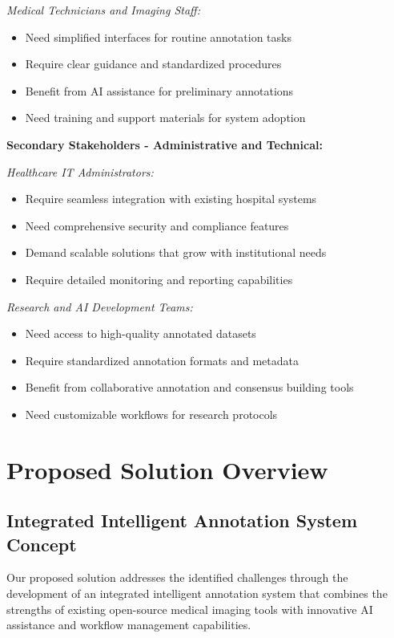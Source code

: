\textit{Medical Technicians and Imaging Staff:}
\begin{itemize}
    \item Need simplified interfaces for routine annotation tasks
    \item Require clear guidance and standardized procedures
    \item Benefit from AI assistance for preliminary annotations
    \item Need training and support materials for system adoption
\end{itemize}

\textbf{Secondary Stakeholders - Administrative and Technical:}

\textit{Healthcare IT Administrators:}
\begin{itemize}
    \item Require seamless integration with existing hospital systems
    \item Need comprehensive security and compliance features
    \item Demand scalable solutions that grow with institutional needs
    \item Require detailed monitoring and reporting capabilities
\end{itemize}

\textit{Research and AI Development Teams:}
\begin{itemize}
    \item Need access to high-quality annotated datasets
    \item Require standardized annotation formats and metadata
    \item Benefit from collaborative annotation and consensus building tools
    \item Need customizable workflows for research protocols
\end{itemize}

\section{Proposed Solution Overview}

\subsection{Integrated Intelligent Annotation System Concept}

Our proposed solution addresses the identified challenges through the development of an integrated intelligent annotation system that combines the strengths of existing open-source medical imaging tools with innovative AI assistance and workflow management capabilities.

